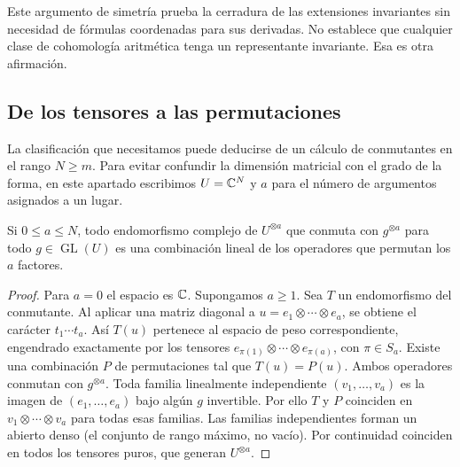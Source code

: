 Este argumento de simetría prueba la cerradura de las extensiones invariantes sin necesidad de fórmulas coordenadas para sus derivadas. No establece que cualquier clase de cohomología aritmética tenga un representante invariante. Esa es otra afirmación.

\subsection{De los tensores a las permutaciones}

La clasificación que necesitamos puede deducirse de un cálculo de conmutantes en el rango $N\ge m$. Para evitar confundir la dimensión matricial con el grado de la forma, en este apartado escribimos $U=\mathbb{C}^N$ y $a$ para el número de argumentos asignados a un lugar.

\begin{lema}
\label{lem:dr-conmutante}
Si $0\le a\le N$, todo endomorfismo complejo de $U^{\otimes a}$ que conmuta con $g^{\otimes a}$ para todo $g\in\operatorname{GL}(U)$ es una combinación lineal de los operadores que permutan los $a$ factores.
\end{lema}
\begin{proof}
Para $a=0$ el espacio es $\mathbb{C}$. Supongamos $a\ge1$. Sea $T$ un endomorfismo del conmutante. Al aplicar una matriz diagonal a $u=e_1\otimes\cdots\otimes e_a$, se obtiene el carácter $t_1\cdots t_a$. Así $T(u)$ pertenece al espacio de peso correspondiente, engendrado exactamente por los tensores $e_{\pi(1)}\otimes\cdots\otimes e_{\pi(a)}$, con $\pi\in S_a$. Existe una combinación $P$ de permutaciones tal que $T(u)=P(u)$. Ambos operadores conmutan con $g^{\otimes a}$. Toda familia linealmente independiente $(v_1,\ldots,v_a)$ es la imagen de $(e_1,\ldots,e_a)$ bajo algún $g$ invertible. Por ello $T$ y $P$ coinciden en $v_1\otimes\cdots\otimes v_a$ para todas esas familias. Las familias independientes forman un abierto denso (el conjunto de rango máximo, no vacío). Por continuidad coinciden en todos los tensores puros, que generan $U^{\otimes a}$.
\end{proof}

